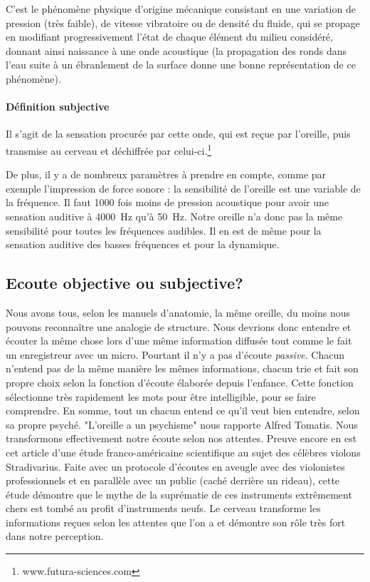 C'est le phénomène phy\-si\-que
d'origine mécanique consistant en une variation de pression (très
faible), de vitesse vibratoire ou de densité du fluide, qui se propage
en modifiant progressivement l'état de chaque élément du milieu considéré,
donnant ainsi naissance à une onde acoustique (la propagation des
ronds dans l'eau suite à un ébranlement de la surface donne une bonne
représentation de ce phénomène). 

\paragraph{Définition subjective}	

	Il s'agit de la sensation procurée
	par cette onde, qui est reçue par l'oreille, puis transmise au cerveau
	et déchiffrée par celui-ci.\footnote{www.futura-sciences.com } 

De plus, il y a de nombreux paramètres à prendre en compte, comme par
exemple l'impression de force sonore : la sensibilité de l'oreille
est une variable de la fréquence. Il faut 1000 fois moins de pression
acoustique pour avoir une sensation auditive à \SI{4000}{\hertz} qu'à \SI{50}{\hertz}.
Notre oreille n'a donc pas la même sensibilité pour toutes
les fréquences audibles. Il en est de même pour la sensation auditive
des basses fréquences et pour la dynamique. 

\subsection{Ecoute objective ou subjective?}

Nous avons tous,
selon les manuels d'anatomie, la même
oreille, du moins nous pouvons reconnaître une analogie de structure. Nous devrions donc entendre et écouter la même chose
lors d'une même information diffusée tout comme le fait un enregistreur avec un micro. Pourtant il n'y a pas d'écoute \emph{passive}. Chacun n'entend pas de la même manière les mêmes
informations, chacun trie et fait son propre choix selon la fonction
d'écoute élaborée depuis l'enfance. Cette fonction sélectionne très
rapidement les mots pour être intelligible, pour se faire comprendre. En somme, tout un chacun entend ce qu'il veut bien
entendre, selon sa propre psyché. 
"L'oreille a un psychisme" nous rapporte Alfred Tomatis.
Nous transformons effectivement notre écoute selon nos attentes. Preuve encore en est cet 
article d'une 
étude franco-américaine scientifique
\autocite{fritz_stradivarius} au sujet des célèbres violons Stradivarius. Faite avec un protocole 
d'écoutes en aveugle avec
des violonistes professionnels et en parallèle avec un public (caché
derrière un rideau), cette étude démontre que le mythe de la suprématie
de ces instruments extrêmement chers est tombé au profit d'instruments
neufs. Le cerveau transforme les informations reçues
selon les attentes que l'on a et démontre son rôle très fort dans 
notre perception.

